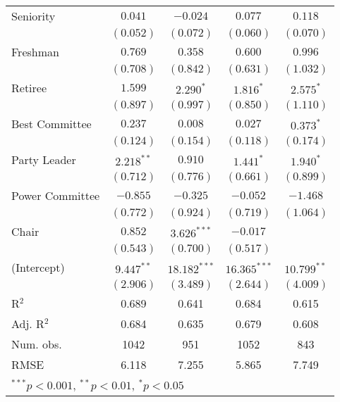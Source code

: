 \documentclass[12pt]{article}
\begin{document}
\begin{table}[H]
\begin{center}
\begin{tabular}{l c c c c }
			Seniority              & $0.041$        & $-0.024$        & $0.077$        & $0.118$       \\
			& $(0.052)$      & $(0.072)$       & $(0.060)$      & $(0.070)$     \\
			Freshman               & $0.769$        & $0.358$         & $0.600$        & $0.996$       \\
			& $(0.708)$      & $(0.842)$       & $(0.631)$      & $(1.032)$     \\
			Retiree                & $1.599$        & $2.290^{*}$     & $1.816^{*}$    & $2.575^{*}$   \\
			& $(0.897)$      & $(0.997)$       & $(0.850)$      & $(1.110)$     \\
			Best Committee        & $0.237$        & $0.008$         & $0.027$        & $0.373^{*}$   \\
			& $(0.124)$      & $(0.154)$       & $(0.118)$      & $(0.174)$     \\
			Party Leader                 & $2.218^{**}$   & $0.910$         & $1.441^{*}$    & $1.940^{*}$   \\
			& $(0.712)$      & $(0.776)$       & $(0.661)$      & $(0.899)$     \\
			Power Committee       & $-0.855$       & $-0.325$        & $-0.052$       & $-1.468$      \\
			& $(0.772)$      & $(0.924)$       & $(0.719)$      & $(1.064)$     \\
			Chair                  & $0.852$        & $3.626^{***}$   & $-0.017$       &               \\
			& $(0.543)$      & $(0.700)$       & $(0.517)$      &               \\
			(Intercept)            & $9.447^{**}$   & $18.182^{***}$  & $16.365^{***}$ & $10.799^{**}$ \\
			& $(2.906)$      & $(3.489)$       & $(2.644)$      & $(4.009)$     \\
			\hline
			R$^2$                  & 0.689          & 0.641           & 0.684          & 0.615         \\
			Adj. R$^2$             & 0.684          & 0.635           & 0.679          & 0.608         \\
			Num. obs.              & 1042           & 951             & 1052           & 843           \\
			RMSE                   & 6.118          & 7.255           & 5.865          & 7.749         \\
			\hline
			\multicolumn{5}{l}{\scriptsize{$^{***}p<0.001$, $^{**}p<0.01$, $^*p<0.05$}}
		\end{tabular}
	\end{center}
\end{table}
 
\end{document}
